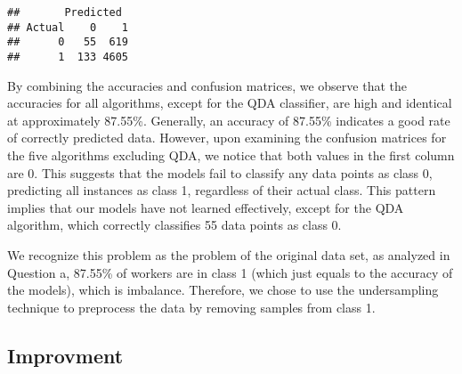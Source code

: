 \documentclass[
]{article}
\newenvironment{Shaded}{\begin{snugshade}}{\end{snugshade}}
\newcommand{\AttributeTok}[1]{\textcolor[rgb]{0.13,0.29,0.53}{#1}}
\newcommand{\DecValTok}[1]{\textcolor[rgb]{0.00,0.00,0.81}{#1}}
\newcommand{\FunctionTok}[1]{\textcolor[rgb]{0.13,0.29,0.53}{\textbf{#1}}}
\newcommand{\NormalTok}[1]{#1}
\newcommand{\OtherTok}[1]{\textcolor[rgb]{0.56,0.35,0.01}{#1}}
\newcommand{\SpecialCharTok}[1]{\textcolor[rgb]{0.81,0.36,0.00}{\textbf{#1}}}
\newcommand{\StringTok}[1]{\textcolor[rgb]{0.31,0.60,0.02}{#1}}
\begin{document}
\begin{Shaded}
\end{Shaded}

\begin{verbatim}
##       Predicted
## Actual    0    1
##      0   55  619
##      1  133 4605
\end{verbatim}

By combining the accuracies and confusion matrices, we observe that the
accuracies for all algorithms, except for the QDA classifier, are high
and identical at approximately 87.55\%. Generally, an accuracy of
87.55\% indicates a good rate of correctly predicted data. However, upon
examining the confusion matrices for the five algorithms excluding QDA,
we notice that both values in the first column are 0. This suggests that
the models fail to classify any data points as class 0, predicting all
instances as class 1, regardless of their actual class. This pattern
implies that our models have not learned effectively, except for the QDA
algorithm, which correctly classifies 55 data points as class 0.

We recognize this problem as the problem of the original data set, as
analyzed in Question a, 87.55\% of workers are in class 1 (which just
equals to the accuracy of the models), which is imbalance. Therefore, we
chose to use the undersampling technique to preprocess the data by
removing samples from class 1.

\hypertarget{improvment}{%
\subsection{Improvment}\label{improvment}}
\end{document}
